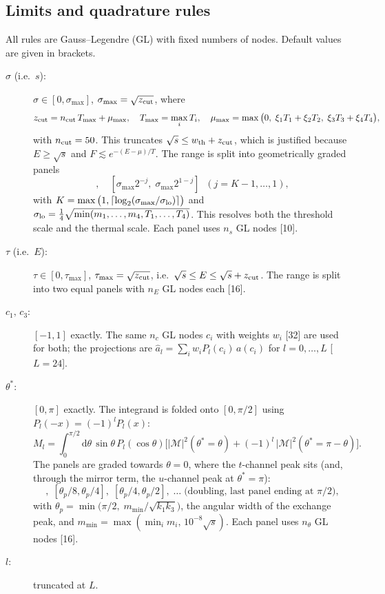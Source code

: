 \documentclass[11pt,a4paper]{article}
\newcommand{\dd}{\mathrm{d}}
\newcommand{\Msq}{|\mathcal{M}|^2}
\begin{document}
\subsection{Limits and quadrature rules}

All rules are Gauss--Legendre (GL) with fixed numbers of nodes. Default
values are given in brackets.

\begin{description}
\item[$\sigma$ (i.e.\ $s$):] $\sigma\in[0,\sigma_{\max}]$, $\sigma_{\max}=\sqrt{z_{\rm cut}}$, where
  \begin{equation}
    z_{\rm cut} = n_{\rm cut}\,T_{\max}+\mu_{\max},\quad
    T_{\max}=\max_iT_i,\quad
    \mu_{\max}=\max\big(0,\;\xi_1T_1+\xi_2T_2,\;\xi_3T_3+\xi_4T_4\big),
  \end{equation}
  with $n_{\rm cut}=50$. This truncates $\sqrt s\le w_{\rm th}+z_{\rm cut}$,
  which is justified because $E\ge\sqrt s$ and $F\lesssim e^{-(E-\mu)/T}$.
  The range is split into geometrically graded panels
  \begin{equation}
    [0,\;\sigma_{\max}2^{1-K}],\quad [\sigma_{\max}2^{-j},\;\sigma_{\max}2^{1-j}]\;\;(j=K-1,\dots,1),
  \end{equation}
  with $K=\max\big(1,\lceil\log_2(\sigma_{\max}/\sigma_{\rm lo})\rceil\big)$ and
  $\sigma_{\rm lo}=\tfrac14\sqrt{\min(m_1,\dots,m_4,T_1,\dots,T_4)}$. This
  resolves both the threshold scale and the thermal scale. Each panel uses
  $n_s$ GL nodes [10].
\item[$\tau$ (i.e.\ $E$):] $\tau\in[0,\tau_{\max}]$, $\tau_{\max}=\sqrt{z_{\rm cut}}$,
  i.e.\ $\sqrt s\le E\le\sqrt s+z_{\rm cut}$. The range is split into two
  equal panels with $n_E$ GL nodes each [16].
\item[$c_1,\,c_3$:] $[-1,1]$ exactly. The same $n_c$ GL nodes $c_i$ with
  weights $w_i$ [32] are used for both; the projections are
  $\hat a_l=\sum_iw_iP_l(c_i)\,a(c_i)$ for $l=0,\dots,L$ [$L=24$].
\item[$\theta^*$:] $[0,\pi]$ exactly. The integrand is folded onto
  $[0,\pi/2]$ using $P_l(-x)=(-1)^lP_l(x)$:
  \begin{equation}
    M_l = \int_0^{\pi/2}\!\dd\theta\,\sin\theta\,P_l(\cos\theta)
    \big[\Msq(\theta^*{=}\theta)+(-1)^l\,\Msq(\theta^*{=}\pi-\theta)\big].
  \end{equation}
  The panels are graded towards $\theta=0$, where the $t$-channel peak sits
  (and, through the mirror term, the $u$-channel peak at $\theta^*=\pi$):
  \begin{equation}
    [0,\theta_p/8],\;[\theta_p/8,\theta_p/4],\;[\theta_p/4,\theta_p/2],\;\dots
    \;\text{(doubling, last panel ending at $\pi/2$)},
  \end{equation}
  with $\theta_p=\min\big(\pi/2,\;m_{\min}/\sqrt{k_1k_3}\big)$, the angular
  width of the exchange peak, and $m_{\min}=\max(\min_im_i,\,10^{-8}\sqrt s)$.
  Each panel uses $n_\theta$ GL nodes [16].
\item[$l$:] truncated at $L$.
\end{description}
\end{document}
